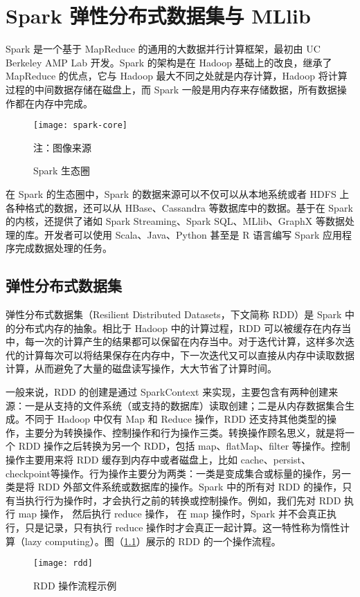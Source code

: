 

\chapter{Spark 弹性分布式数据集与 MLlib}
\label{cha:spark_RDD_mllib}
Spark 是一个基于 MapReduce 的通用的大数据并行计算框架，最初由 UC Berkeley AMP Lab 开发。Spark 的架构是在 Hadoop 基础上的改良，继承了 MapReduce 的优点，它与 Hadoop 最大不同之处就是内存计算，Hadoop 将计算过程的中间数据存储在磁盘上，而 Spark 一般是用内存来存储数据，所有数据操作都在内存中完成。
\begin{figure}[H]
  \centering
  \texttt{[image: spark-core]}
  \caption{Spark 生态圈}
  \footnotesize 注：图像来源\protect\footnotemark
\end{figure}
在 Spark 的生态圈中，Spark 的数据来源可以不仅可以从本地系统或者 HDFS 上各种格式的数据，还可以从 HBase、Cassandra 等数据库中的数据。基于在 Spark 的内核，还提供了诸如 Spark Streaming、Spark SQL、MLlib、GraphX 等数据处理的库。开发者可以使用 Scala、Java、Python 甚至是 R 语言编写 Spark 应用程序完成数据处理的任务。
\section{弹性分布式数据集}
弹性分布式数据集（Resilient Distributed Datasets，下文简称 RDD）\cite{Zaharia2012}是 Spark 中的分布式内存的抽象。相比于 Hadoop 中的计算过程，RDD 可以被缓存在内存当中，每一次的计算产生的结果都可以保留在内存当中。对于迭代计算，这样多次迭代的计算每次可以将结果保存在内存中，下一次迭代又可以直接从内存中读取数据计算，从而避免了大量的磁盘读写操作，大大节省了计算时间。

一般来说，RDD 的创建是通过 SparkContext 来实现，主要包含有两种创建来源：一是从支持的文件系统（或支持的数据库）读取创建；二是从内存数据集合生成。不同于 Hadoop 中仅有 Map 和 Reduce 操作，RDD 还支持其他类型的操作，主要分为转换操作、控制操作和行为操作三类。转换操作顾名思义，就是将一个 RDD 操作之后转换为另一个 RDD，包括 map、flatMap、filter 等操作。控制操作主要用来将 RDD 缓存到内存中或者磁盘上，比如 cache、persist、checkpoint等操作。行为操作主要分为两类：一类是变成集合或标量的操作，另一类是将 RDD 外部文件系统或数据库的操作。Spark 中的所有对 RDD 的操作，只有当执行行为操作时，才会执行之前的转换或控制操作。例如，我们先对 RDD 执行 map 操作， 然后执行 reduce 操作， 在 map 操作时，Spark 并不会真正执行，只是记录，只有执行 reduce 操作时才会真正一起计算。这一特性称为惰性计算（lazy computing）。图（\ref{fig:rdd}）展示的 RDD 的一个操作流程。
\begin{figure}[H]
  \centering
  \texttt{[image: rdd]}
  \caption{RDD 操作流程示例}
  \label{fig:rdd}
\end{figure}


